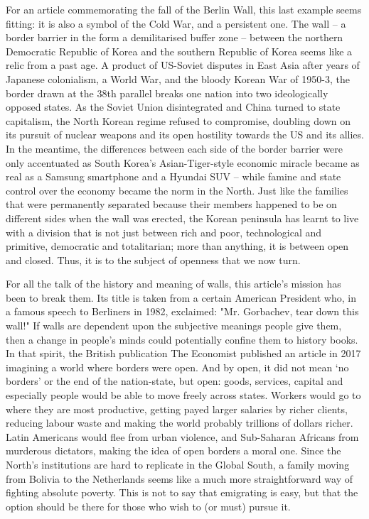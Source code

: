    For an article commemorating the fall of the Berlin Wall, this last
   example seems fitting: it is also a symbol of the Cold War, and a
   persistent one. The wall -- a border barrier in the form a
   demilitarised buffer zone -- between the northern Democratic Republic
   of Korea and the southern Republic of Korea seems like a relic from a
   past age. A product of US-Soviet disputes in East Asia after years of
   Japanese colonialism, a World War, and the bloody Korean War of 1950-3,
   the border drawn at the 38th parallel breaks one nation into two
   ideologically opposed states. As the Soviet Union disintegrated and
   China turned to state capitalism, the North Korean regime refused to
   compromise, doubling down on its pursuit of nuclear weapons and its
   open hostility towards the US and its allies. In the meantime, the
   differences between each side of the border barrier were only
   accentuated as South Korea's Asian-Tiger-style economic miracle became
   as real as a Samsung smartphone and a Hyundai SUV -- while famine and
   state control over the economy became the norm in the North. Just like
   the families that were permanently separated because their members
   happened to be on different sides when the wall was erected, the Korean
   peninsula has learnt to live with a division that is not just between
   rich and poor, technological and primitive, democratic and
   totalitarian; more than anything, it is between open and closed. Thus,
   it is to the subject of openness that we now turn.

   For all the talk of the history and meaning of walls, this article's
   mission has been to break them. Its title is taken from a certain
   American President who, in a famous speech to Berliners in 1982,
   exclaimed: "Mr. Gorbachev, tear down this wall!" If walls are dependent
   upon the subjective meanings people give them, then a change in
   people's minds could potentially confine them to history books. In that
   spirit, the British publication The Economist published an article in
   2017 imagining a world where borders were open. And by open, it did not
   mean `no borders' or the end of the nation-state, but open: goods,
   services, capital and especially people would be able to move freely
   across states. Workers would go to where they are most productive,
   getting payed larger salaries by richer clients, reducing labour waste
   and making the world probably trillions of dollars richer. Latin
   Americans would flee from urban violence, and Sub-Saharan Africans from
   murderous dictators, making the idea of open borders a moral one. Since
   the North's institutions are hard to replicate in the Global South, a
   family moving from Bolivia to the Netherlands seems like a much more
   straightforward way of fighting absolute poverty. This is not to say
   that emigrating is easy, but that the option should be there for those
   who wish to (or must) pursue it.

